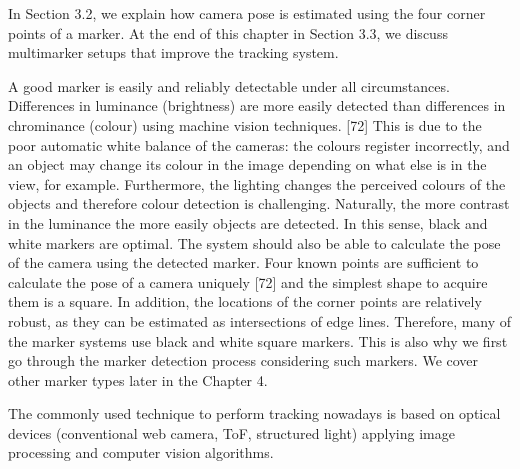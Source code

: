 In Section 3.2, we explain how camera pose is estimated using the four corner
points of a marker. At the end of this chapter in Section 3.3, we discuss multimarker
setups that improve the tracking system.


A good marker is easily and reliably detectable under all circumstances. Differences in luminance (brightness) are more easily detected than differences in chrominance (colour) using machine vision techniques. [72] This is due to the poor automatic white balance of the cameras: the colours register incorrectly, and an object may change its colour in the image depending on what else is in the view, for example. Furthermore, the lighting changes the perceived colours of the objects and therefore colour detection is challenging. Naturally, the more contrast in the luminance the more easily objects are detected. In this sense, black and white markers are optimal. The system should also be able to calculate the pose of the camera using the detected marker. Four known points are sufficient to calculate the pose of a camera uniquely [72] and the simplest shape to acquire them is a square. In addition, the locations of the corner points are relatively robust, as they can be estimated as intersections of edge lines. Therefore, many of the marker systems use black and white square markers. This is also why we first go through the marker detection process considering such markers. We cover other marker types later in the Chapter 4.




The commonly used technique to perform tracking nowadays is based on optical devices (conventional web camera, ToF, structured light) applying image processing and computer vision algorithms. 

